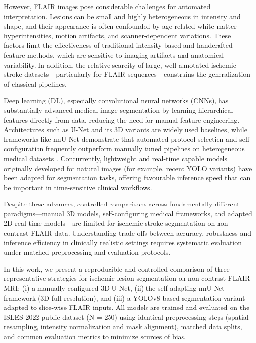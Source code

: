 \documentclass[12pt]{article}
\begin{document}
However, FLAIR images pose considerable challenges for automated interpretation. Lesions can be small and highly heterogeneous in intensity and shape, and their appearance is often confounded by age-related white matter hyperintensities, motion artifacts, and scanner-dependent variations. These factors limit the effectiveness of traditional intensity-based and handcrafted-feature methods, which are sensitive to imaging artifacts and anatomical variability. In addition, the relative scarcity of large, well-annotated ischemic stroke datasets—particularly for FLAIR sequences—constrains the generalization of classical pipelines.

Deep learning (DL), especially convolutional neural networks (CNNs), has substantially advanced medical image segmentation by learning hierarchical features directly from data, reducing the need for manual feature engineering. Architectures such as U-Net and its 3D variants are widely used baselines, while frameworks like nnU-Net demonstrate that automated protocol selection and self-configuration frequently outperform manually tuned pipelines on heterogeneous medical datasets \cite{Isensee2021}. Concurrently, lightweight and real-time capable models originally developed for natural images (for example, recent YOLO variants) have been adapted for segmentation tasks, offering favourable inference speed that can be important in time-sensitive clinical workflows.

Despite these advances, controlled comparisons across fundamentally different paradigms—manual 3D models, self-configuring medical frameworks, and adapted 2D real-time models—are limited for ischemic stroke segmentation on non-contrast FLAIR data. Understanding trade-offs between accuracy, robustness and inference efficiency in clinically realistic settings requires systematic evaluation under matched preprocessing and evaluation protocols.

In this work, we present a reproducible and controlled comparison of three representative strategies for ischemic lesion segmentation on non-contrast FLAIR MRI: (i) a manually configured 3D U-Net, (ii) the self-adapting nnU-Net framework (3D full-resolution), and (iii) a YOLOv8-based segmentation variant adapted to slice-wise FLAIR inputs. All models are trained and evaluated on the ISLES 2022 public dataset (N = 250) using identical preprocessing steps (spatial resampling, intensity normalization and mask alignment), matched data splits, and common evaluation metrics to minimize sources of bias.
\end{document}
